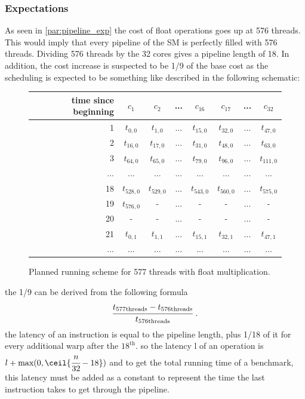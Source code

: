 \documentclass{report}
\begin{document}
	\subsubsection{Expectations}
	As seen in \ref{par:pipeline_exp} the cost of float
    operations goes up at 576 threads. This would imply that every pipeline of
    the SM is perfectly filled with 576 threads. Dividing 576 threads by
    the 32 cores gives a pipeline length of 18. In addition, the cost increase
    is suspected to be 1/9 of the base cost as the scheduling is expected to be
    something like described in the following schematic:
    
    \begin{figure}[h]
      \centering
       \begin{tabular}{ | r || c | c | c | c || c | c | c | }
    	    \hline
    	    time since beginning & $c_1$ & $c_2$ & ... & $c_{16}$ & $c_{17}$ & ... & $c_{32}$ \\ \hline  \hline
    	   1 & $t_{0,0}$ & $t_{1,0}$ & ... & $t_{15,0}$ & $t_{32, 0}$ & ... & $t_{47, 0}$ \\ \hline 
    	   2 & $t_{16,0}$ & $t_{17,0}$ & ... & $t_{31,0}$ & $t_{48, 0}$ & ... & $t_{63, 0}$ \\ \hline
    	   3 & $t_{64,0}$ & $t_{65,0}$ & ... & $t_{79,0}$ & $t_{96, 0}$ & ... & $t_{111, 0}$ \\ \hline
    	   ... & ... & ... & ... & ... & ... & ... & ... \\ \hline
    	   18 & $t_{528,0}$ & $t_{529,0}$ & ... & $t_{543,0}$ & $t_{560,0}$ & ... & $t_{575, 0}$ \\ \hline
    	   19 & $t_{576,0}$ & - & ... & - & - & ... & - \\ \hline
    	   20 & - & - & ... & - & - & ... & - \\ \hline
    	   21 & $t_{0,1}$ & $t_{1,1}$ & ... & $t_{15,1}$ & $t_{32,1}$ & ... & $t_{47,1}$ \\ \hline
    	   ... & ... & ... & ... & ... & ... & ... & ... \\ \hline
  	\end{tabular}
  	\captionsetup{justification=centering}
  	\caption{Planned running scheme for 577 threads with float multiplication.}
  	\label{fig:fp_prediction_513}
   \end{figure}

    the 1/9 can be derived from the following formula
    \[ \cfrac{t_{\text{577threads}} - t_{\text{576threads}}}{t_{\text{576threads}}} \text{  .}\]
    the latency of an instruction is equal to the pipeline length, plus 1/18 of
    it for every additional warp after the $18^{\text{th}}$. so the latency l of an 
    operation is $l + \text{max}(0, \ceil{\cfrac{n}{32} -18})$ and to get the total
    running time of a benchmark, this latency must be added as a constant to
    represent the time the last instruction takes to get through the pipeline.
\end{document}
